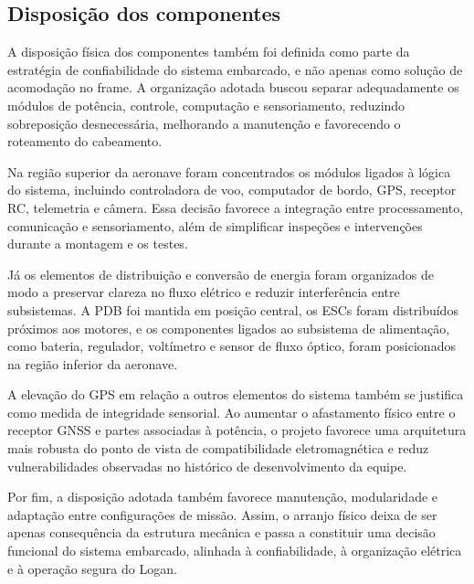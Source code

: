 \subsection{Disposição dos componentes}

A disposição física dos componentes também foi definida como parte da estratégia de confiabilidade do sistema embarcado, e não apenas como solução de acomodação no frame. A organização adotada buscou separar adequadamente os módulos de potência, controle, computação e sensoriamento, reduzindo sobreposição desnecessária, melhorando a manutenção e favorecendo o roteamento do cabeamento.

Na região superior da aeronave foram concentrados os módulos ligados à lógica do sistema, incluindo controladora de voo, computador de bordo, GPS, receptor RC, telemetria e câmera. Essa decisão favorece a integração entre processamento, comunicação e sensoriamento, além de simplificar inspeções e intervenções durante a montagem e os testes.

Já os elementos de distribuição e conversão de energia foram organizados de modo a preservar clareza no fluxo elétrico e reduzir interferência entre subsistemas. A PDB foi mantida em posição central, os ESCs foram distribuídos próximos aos motores, e os componentes ligados ao subsistema de alimentação, como bateria, regulador, voltímetro e sensor de fluxo óptico, foram posicionados na região inferior da aeronave.

A elevação do GPS em relação a outros elementos do sistema também se justifica como medida de integridade sensorial. Ao aumentar o afastamento físico entre o receptor GNSS e partes associadas à potência, o projeto favorece uma arquitetura mais robusta do ponto de vista de compatibilidade eletromagnética e reduz vulnerabilidades observadas no histórico de desenvolvimento da equipe.

Por fim, a disposição adotada também favorece manutenção, modularidade e adaptação entre configurações de missão. Assim, o arranjo físico deixa de ser apenas consequência da estrutura mecânica e passa a constituir uma decisão funcional do sistema embarcado, alinhada à confiabilidade, à organização elétrica e à operação segura do Logan.
